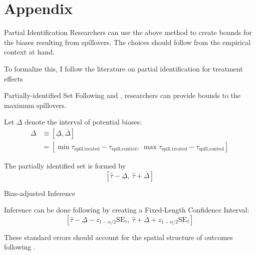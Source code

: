 \documentclass[aspectratio=169]{beamer}
\begin{document}
\appendix\section{Appendix}


\begin{frame}{Partial Identification}\label{slide:partial_identification}
    Researchers can use the above method to create bounds for the biases resulting from spillovers. The choices should follow from the empirical context at hand.

    To formalize this, I follow the literature on partial identification for treatment effects
    \begin{citecolor}
    \end{citecolor}
\end{frame}

\begin{frame}{Partially-identified Set}
    Following \citet{Rambachan_Roth_2020} and \citet{Manski_Pepper_2018}, researchers can provide bounds to the maximum spillovers. 

    Let $\Delta$ denote the interval of potential biases: 
    \begin{align*}
        \Delta &\equiv [\underline{\Delta}, \overline{\Delta}] \\
        &= \left[ \min \tau_{\text{spill,treated}} - \tau_{\text{spill,control}}, \ \max \tau_{\text{spill,treated}} - \tau_{\text{spill,control}} \right] 
    \end{align*}

    The partially identified set is formed by \[ 
        \left[\hat{\tau} - \underline{\Delta} , \ \hat{\tau} + \overline{\Delta} \right]    
    \]

\end{frame}

\begin{frame}{Bias-adjusted Inference}

    Inference can be done following \citet{Rambachan_Roth_2020} by creating a Fixed-Length Confidence Interval: 
    \[ 
        \left[
            \hat{\tau} - \underline{\Delta} - z_{1 - \alpha/2} \text{SE}_{\hat{\tau}}, \ \hat{\tau} + \overline{\Delta} + z_{1 - \alpha/2} \text{SE}_{\hat{\tau}}
        \right]
    \]

    These standard errors should account for the spatial structure of outcomes following \citet{Conley_1999}.

    \hyperlink{slide:example_bias}{}
\end{frame}
\end{document}
